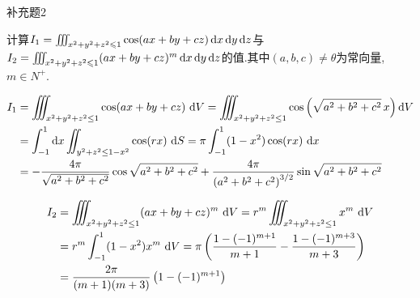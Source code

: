 \begin{exercise}
    {补充题2}

    计算$I_1= \iiint_{x^2 + y^2 + z^2 \leqslant 1} \cos (ax + by + cz) \operatorname{d\!} x \operatorname{d\!} y \operatorname{d\!} z$与$I_2 = \iiint_{x^2 + y^2 + z^2 \leqslant 1} (ax + by + cz)^m \operatorname{d\!} x \operatorname{d\!} y \operatorname{d\!} z$的值.其中$(a,b,c) \neq \theta$为常向量,$m \in N^+$.
\end{exercise}

\begin{solution}
    \begin{align*}
        I_1 &= \iiint_{x^2 + y^2 + z^2 \leq 1} \cos(ax + by + cz) \, \operatorname{d\!} V 
        = \iiint_{x^2 + y^2 + z^2 \leq 1} \cos\left( \sqrt{a^2 + b^2 + c^2} \, x \right) \operatorname{d\!} V \\
        &= \int_{-1}^{1} \operatorname{d\!} x \iint_{y^2 + z^2 \leq 1 - x^2} \cos(rx) \, \operatorname{d\!} S 
        = \pi \int_{-1}^{1} (1 - x^2) \cos(rx) \, \operatorname{d\!} x \\
        &= -\frac{4\pi}{\sqrt{a^2 + b^2 + c^2}} \cos \sqrt{a^2 + b^2 + c^2} 
        + \frac{4\pi}{\left( a^2 + b^2 + c^2 \right)^{3/2}} \sin \sqrt{a^2 + b^2 + c^2}
        \end{align*}

        \begin{align*}
            I_2 &= \iiint_{x^2 + y^2 + z^2 \leq 1} (ax + by + cz)^m \, \operatorname{d\!} V 
            = r^m \iiint_{x^2 + y^2 + z^2 \leq 1} x^m \, \operatorname{d\!} V \\
            &= r^m \int_{-1}^{1} (1 - x^2) x^m \, \operatorname{d\!} V 
            = \pi \left( \frac{1 - (-1)^{m+1}}{m + 1} - \frac{1 - (-1)^{m+3}}{m + 3} \right) \\
            &= \frac{2\pi}{(m+1)(m+3)} \left( 1 - (-1)^{m+1} \right)
            \end{align*}

\end{solution}




